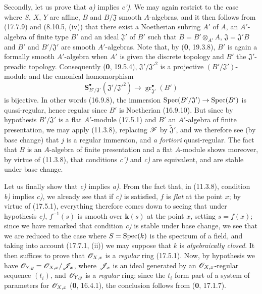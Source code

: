 Secondly, let us prove that \emph{a)} implies \emph{c')}. We may again restrict to the case where $S$, $X$, $Y$ are affine, $B$ and $B/\mathfrak J$ smooth $A$-algebras, and it then follows from (17.7.9) and (8.10.5, (iv)) that there exist a Noetherian subring $A'$ of $A$, an $A'$-algebra of finite type $B'$ and an ideal $\mathfrak J'$ of $B'$ such that $B=B'\otimes_{A'}A$, $\mathfrak J=\mathfrak J'B$ and $B'$ and $B'/\mathfrak J'$ are smooth $A'$-algebras. Note that, by (\textbf{0}, 19.3.8), $B'$ is again a formally smooth $A'$-algebra when $A'$ is given the discrete topology and $B'$ the $\mathfrak J'$-preadic topology. Consequently (\textbf{0}, 19.5.4), $\mathfrak J'/\mathfrak J'^2$ is a projective $(B'/\mathfrak J')$-module and the canonical homomorphism
\[
\mathbf{S}^{\bullet}_{B'/\mathfrak J'}(\mathfrak J'/\mathfrak J'^2)\to\operatorname{gr}_{\mathfrak J'}^{\bullet}(B')
\]
is bijective. In other words (16.9.8), the immersion $\operatorname{Spec}(B'/\mathfrak J')\to\operatorname{Spec}(B')$ is quasi-regular, hence regular since $B'$ is Noetherian (16.9.10). But since by hypothesis $B'/\mathfrak J'$ is a flat $A'$-module (17.5.1) and $B'$ an $A'$-algebra of finite presentation, we may apply (11.3.8), replacing $\mathscr{F}$ by $\widetilde{\mathfrak J}'$, and we therefore see (by base change) that $j$ is a regular immersion, and \emph{a fortiori} quasi-regular. The fact that $B$ is an $A$-algebra of finite presentation and a flat $A$-module shows moreover, by virtue of (11.3.8), that conditions \emph{c')} and \emph{c)} are equivalent, and are stable under base change.

Let us finally show that \emph{c)} implies \emph{a)}. From the fact that, in (11.3.8), condition \emph{b)} implies \emph{c)}, we already see that if \emph{c)} is satisfied, $f$ is \emph{flat} at the point $x$; by virtue of (17.5.1), everything therefore comes down to seeing that under hypothesis \emph{c)}, $f^{-1}(s)$ is smooth over $\boldsymbol{k}(s)$ at the point $x$, setting $s=f(x)$; since we have remarked that condition \emph{c)} is stable under base change, we see that we are reduced to the case where $S=\operatorname{Spec}(k)$ is the spectrum of a field, and taking into account (17.7.1, (ii)) we may suppose that $k$ is \emph{algebraically closed}. It then suffices to prove that $\mathscr{O}_{X,x}$ is a \emph{regular} ring (17.5.1). Now, by hypothesis we have $\mathscr{O}_{Y,y}=\mathscr{O}_{X,x}/\mathscr{J}_x$, where $\mathscr{J}_x$ is an ideal generated by an $\mathscr{O}_{X,x}$-regular sequence $(t_i)$, and $\mathscr{O}_{Y,y}$ is a \emph{regular} ring; since the $t_i$ form part of a system of parameters for $\mathscr{O}_{X,x}$ (\textbf{0}, 16.4.1), the conclusion follows from (\textbf{0}, 17.1.7).

